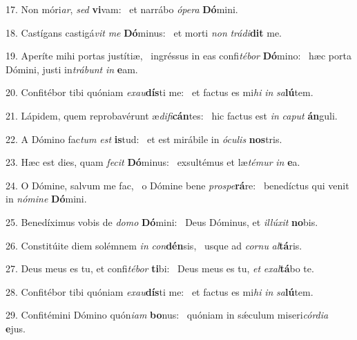17. Non móri\textit{ar}, \textit{sed} \textbf{vi}vam: \ast\  et narrábo \textit{ó}\textit{pe}\textit{ra} \textbf{Dó}mini.\

18. Castígans castigá\textit{vit} \textit{me} \textbf{Dó}minus: \ast\  et morti \textit{non} \textit{trá}\textit{di}\textbf{dit} me.\

19. Aperíte mihi portas justítiæ, \dag\  ingréssus in eas confi\textit{té}\textit{bor} \textbf{Dó}mino: \ast\  hæc porta Dómini, justi in\textit{trá}\textit{bunt} \textit{in} \textbf{e}am.\

20. Confitébor tibi quóniam \textit{ex}\textit{au}\textbf{dís}ti me: \ast\  et factus es mi\textit{hi} \textit{in} \textit{sa}\textbf{lú}tem.\

21. Lápidem, quem reprobavérunt æ\textit{di}\textit{fi}\textbf{cán}tes: \ast\  hic factus est \textit{in} \textit{ca}\textit{put} \textbf{án}guli.\

22. A Dómino fac\textit{tum} \textit{est} \textbf{is}tud: \ast\  et est mirábile in \textit{ó}\textit{cu}\textit{lis} \textbf{nos}tris.\

23. Hæc est dies, quam \textit{fe}\textit{cit} \textbf{Dó}minus: \ast\  exsultémus et læ\textit{té}\textit{mur} \textit{in} \textbf{e}a.\

24. O Dómine, salvum me fac, \dag\  o Dómine bene \textit{pro}\textit{spe}\textbf{rá}re: \ast\  benedíctus qui venit in \textit{nó}\textit{mi}\textit{ne} \textbf{Dó}mini.\

25. Benedíximus vobis de \textit{do}\textit{mo} \textbf{Dó}mini: \ast\  Deus Dóminus, et \textit{il}\textit{lú}\textit{xit} \textbf{no}bis.\

26. Constitúite diem solémnem \textit{in} \textit{con}\textbf{dén}sis, \ast\  usque ad \textit{cor}\textit{nu} \textit{al}\textbf{tá}ris.\

27. Deus meus es tu, et confi\textit{té}\textit{bor} \textbf{ti}bi: \ast\  Deus meus es tu, \textit{et} \textit{ex}\textit{al}\textbf{tá}bo te.\

28. Confitébor tibi quóniam \textit{ex}\textit{au}\textbf{dís}ti me: \ast\  et factus es mi\textit{hi} \textit{in} \textit{sa}\textbf{lú}tem.\

29. Confitémini Dómino quón\textit{i}\textit{am} \textbf{bo}nus: \ast\  quóniam in sǽculum miseri\textit{cór}\textit{di}\textit{a} \textbf{e}jus.\

